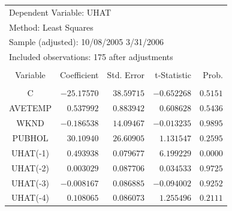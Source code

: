 \documentclass[12pt]{report}
\begin{document}
\vspace{-\baselineskip}
\begin{table}[H]
	\centering
	\begin{tabular}{lrrrr}
		\multicolumn{3}{l}{Dependent Variable: UHAT}&\multicolumn{1}{c}{}&\multicolumn{1}{c}{}\\
		\multicolumn{3}{l}{Method: Least Squares}&\multicolumn{1}{c}{}&\multicolumn{1}{c}{}\\
		\multicolumn{4}{l}{Sample (adjusted): 10/08/2005 3/31/2006}&\multicolumn{1}{c}{}\\
		\multicolumn{5}{l}{Included observations: 175 after adjustments}\\
		[4.5pt] \hline \\ [-4.5pt]
		\multicolumn{1}{c}{Variable}&\multicolumn{1}{r}{Coefficient}&\multicolumn{1}{r}{Std. Error}&\multicolumn{1}{r}{t-Statistic}&\multicolumn{1}{r}{Prob.}\\
		[4.5pt] \hline \\ [-4.5pt]
		\multicolumn{1}{c}{C}&\multicolumn{1}{r}{$-25.17570$}&\multicolumn{1}{r}{$38.59715$}&\multicolumn{1}{r}{$-0.652268$}&\multicolumn{1}{r}{$0.5151$}\\
		\multicolumn{1}{c}{AVETEMP}&\multicolumn{1}{r}{$0.537992$}&\multicolumn{1}{r}{$0.883942$}&\multicolumn{1}{r}{$0.608628$}&\multicolumn{1}{r}{$0.5436$}\\
		\multicolumn{1}{c}{WKND}&\multicolumn{1}{r}{$-0.186538$}&\multicolumn{1}{r}{$14.09467$}&\multicolumn{1}{r}{$-0.013235$}&\multicolumn{1}{r}{$0.9895$}\\
		\multicolumn{1}{c}{PUBHOL}&\multicolumn{1}{r}{$30.10940$}&\multicolumn{1}{r}{$26.60905$}&\multicolumn{1}{r}{$1.131547$}&\multicolumn{1}{r}{$0.2595$}\\
		\multicolumn{1}{c}{UHAT(-1)}&\multicolumn{1}{r}{$0.493938$}&\multicolumn{1}{r}{$0.079677$}&\multicolumn{1}{r}{$6.199229$}&\multicolumn{1}{r}{$0.0000$}\\
		\multicolumn{1}{c}{UHAT(-2)}&\multicolumn{1}{r}{$0.003029$}&\multicolumn{1}{r}{$0.087706$}&\multicolumn{1}{r}{$0.034533$}&\multicolumn{1}{r}{$0.9725$}\\
		\multicolumn{1}{c}{UHAT(-3)}&\multicolumn{1}{r}{$-0.008167$}&\multicolumn{1}{r}{$0.086885$}&\multicolumn{1}{r}{$-0.094002$}&\multicolumn{1}{r}{$0.9252$}\\
		\multicolumn{1}{c}{UHAT(-4)}&\multicolumn{1}{r}{$0.108065$}&\multicolumn{1}{r}{$0.086073$}&\multicolumn{1}{r}{$1.255496$}&\multicolumn{1}{r}{$0.2111$}\\

\end{tabular}
\end{table}
\end{document}
